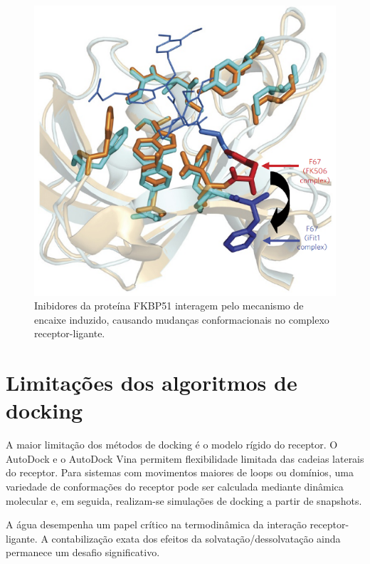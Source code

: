 \begin{figure}[H]
\centering
\includegraphics[scale=0.35]{Figuras/induced_fit2.png}
\caption{Inibidores da proteína FKBP51 interagem pelo mecanismo de encaixe induzido, causando mudanças conformacionais no complexo receptor-ligante.  \cite{Gaali2015}}
\end{figure}

\section{Limitações dos algoritmos de docking}

A maior limitação dos métodos de docking é o modelo rígido do receptor. O AutoDock e o AutoDock Vina permitem flexibilidade limitada das cadeias laterais do receptor. Para sistemas com movimentos maiores de loops ou domínios, uma variedade de conformações do receptor pode ser calculada mediante dinâmica molecular e, em seguida, realizam-se simulações de docking a partir de snapshots. \cite{Autodock2016}

A água desempenha um papel crítico na termodinâmica da interação receptor-ligante. A contabilização exata dos efeitos da solvatação/dessolvatação ainda permanece um desafio significativo. \cite{Yuriev2015}

